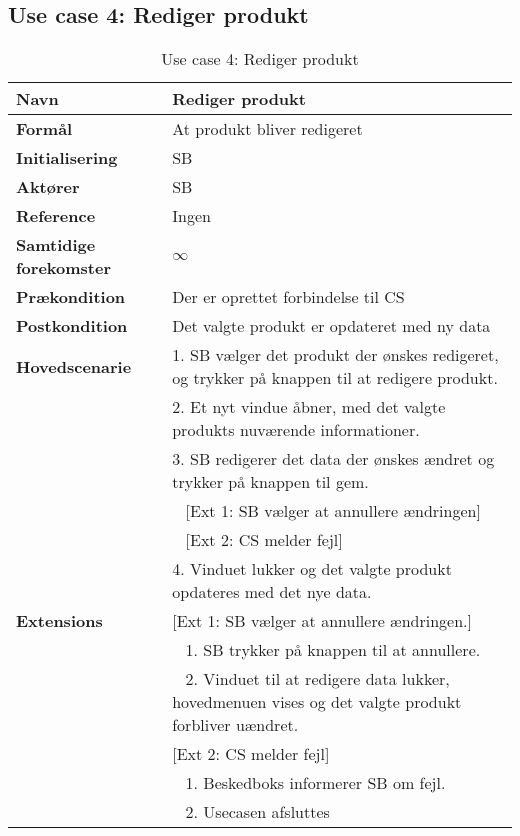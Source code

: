 \subsection{Use case 4: Rediger produkt}


\begin{table}[H]
\begin{tabularx}{\textwidth}{|l|X|}
\hline
\textbf{Navn}					& Rediger produkt \\\hline
\textbf{Formål}					& At produkt bliver redigeret \\\hline
\textbf{Initialisering}			& \gls{SB} \\\hline
\textbf{Aktører}				& \gls{SB} \\\hline
\textbf{Reference}				& Ingen \\\hline
								
\textbf{Samtidige forekomster}	& $\infty$ \\
\hline
\textbf{Prækondition}			& Der er oprettet forbindelse til \gls{CS} \\
\hline
\textbf{Postkondition}			& Det valgte produkt er opdateret med ny data \\
\hline
\textbf{Hovedscenarie}			& 1. \gls{SB} vælger det produkt der ønskes redigeret, og trykker på knappen til at redigere produkt.\\
								& 2. Et nyt vindue åbner, med det valgte produkts nuværende informationer.\\
								& 3. \gls{SB} redigerer det data der ønskes ændret og trykker på knappen til gem.\\
								& ~ [Ext 1: \gls{SB} vælger at annullere ændringen]\\
								& ~ [Ext 2: \gls{CS} melder fejl]\\
								& 4. Vinduet lukker og det valgte produkt opdateres med det nye data.\\
\hline
\textbf{Extensions}				& [Ext 1: \gls{SB} vælger at annullere ændringen.] \\
								& ~ 1. \gls{SB} trykker på knappen til at annullere.\\
								& ~ 2. Vinduet til at redigere data lukker, hovedmenuen vises og det valgte produkt forbliver uændret.\\
								& [Ext 2: \gls{CS} melder fejl] \\
								& ~ 1. Beskedboks informerer \gls{SB} om fejl. \\
								& ~ 2. Usecasen afsluttes \\\hline
								
\end{tabularx}
\caption{Use case 4: Rediger produkt}
\label{tab:UCrp}
\end{table}